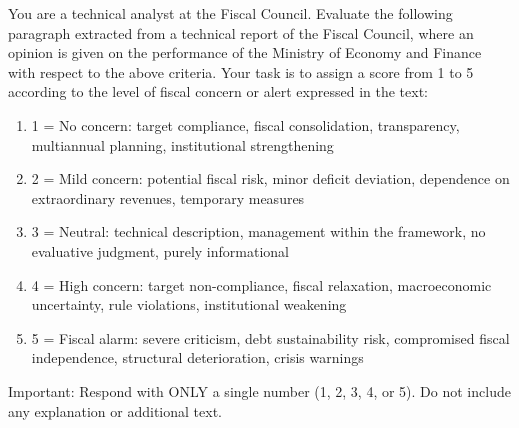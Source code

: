 \documentclass[a4paper, fleqn, 12pt]{article}
\begin{document}

You are a technical analyst at the Fiscal Council. Evaluate the following paragraph extracted from a technical report of the Fiscal Council, where an opinion is given on the performance of the Ministry of Economy and Finance with respect to the above criteria. Your task is to assign a score from 1 to 5 according to the level of fiscal concern or alert expressed in the text:

\begin{enumerate}
  \item[] {1 = No concern:} target compliance, fiscal consolidation, transparency, multiannual planning, institutional strengthening
  \item[] {2 = Mild concern:} potential fiscal risk, minor deficit deviation, dependence on extraordinary revenues, temporary measures
  \item[] {3 = Neutral:} technical description, management within the framework, no evaluative judgment, purely informational
  \item[] {4 = High concern:} target non-compliance, fiscal relaxation, macroeconomic uncertainty, rule violations, institutional weakening
  \item[] {5 = Fiscal alarm:} severe criticism, debt sustainability risk, compromised fiscal independence, structural deterioration, crisis warnings
\end{enumerate}

{Important:} Respond with ONLY a single number (1, 2, 3, 4, or 5). Do not include any explanation or additional text.

\endgroup
\end{document}
